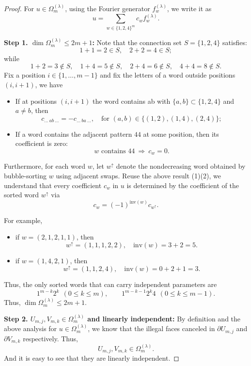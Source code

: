 \documentclass[11pt]{amsart}
\theoremstyle{plain}
\theoremstyle{definition}
\numberwithin{equation}{section}
\begin{document}
\begin{proof}
For $u\in\Omega_m^{(\lambda)}$, using the Fourier generator $f_w^{(\lambda)}$, we write it as
\[u=\sum_{w\in\{1,2,4\}^m}c_wf_w^{(\lambda)}.\]

\noindent\textbf{Step 1. $\dim \Omega_m^{(\lambda)}\leq 2m+1$:}
Note that the connection set $S=\{1,2,4\}$ satisfies:
\[1+1=2\in S, \quad 2+2=4\in S;\]
while
\[1+2=3\notin S,\quad 1+4=5\notin S, \quad 2+4=6\notin S,\quad 4+4=8\notin S.\]
Fix a position $i\in\{1,\ldots,m-1\}$ and fix the letters of a word outside positions $(i,i+1)$, we have
\begin{itemize}
    \item[(1)] If at positions $(i,i+1)$ the word contains ab with $\{a,b\}\subset\{1,2,4\}$ and $a\neq b$, then
    \[c_{\ldots~ab~\ldots}=-c_{\ldots~ba~\ldots},\quad \text{for } (a,b)\in\{(1,2),(1,4),(2,4)\};\]
    \item[(2)]  If a word contains the adjacent pattern $44$ at some position, then its coefficient is zero:
    \[w \text{ contains } 44~\Rightarrow ~c_w=0.\]
\end{itemize}

Furthermore, for each word $w$, let $w^{\uparrow}$ denote the nondecreasing word obtained by bubble-sorting $w$ using adjacent
swaps. Reuse the above result (1)(2), we understand that every coefficient $c_w$ in $u$ is determined by the coefficient of the sorted word $w^{\uparrow}$ via
\[c_w=(-1)^{\mathrm{inv}(w)}c_{w^{\uparrow}}.\]

For example, 
\begin{itemize}
\setlength{\itemsep}{0pt}
    \item if $w=(2,1,2,1,1)$, then
\[w^{\uparrow}=(1,1,1,2,2),\quad \mathrm{inv}(w)=3+2=5.\]
    \item if $w=(1,4,2,1)$, then
\[w^{\uparrow}=(1,1,2,4),\quad \mathrm{inv}(w)=0+2+1=3.\]
\end{itemize}


Thus, the only sorted words that can carry independent parameters are 
\[1^{m-k}2^k ~~(0\le k\le m),\qquad 1^{m-k-1}2^k4~~(0\le k\le m-1).\]
Thus, $\dim\Omega_m^{(\lambda)}\leq 2m+1$. 

\medskip
\noindent\textbf{Step 2. $U_{m,j}, V_{m,k}\in\Omega_m^{(\lambda)}$ and linearly independent:}
By definition and the above analysis for $u\in\Omega_m^{(\lambda)}$, we know that the illegal faces canceled in $\partial U_{m,j}$ and $\partial V_{m,k}$ respectively. Thus,
\[U_{m,j}, V_{m,k}\in\Omega_m^{(\lambda)}.\]
And it is easy to see that they are linearly independent.
\end{proof}
\end{document}
